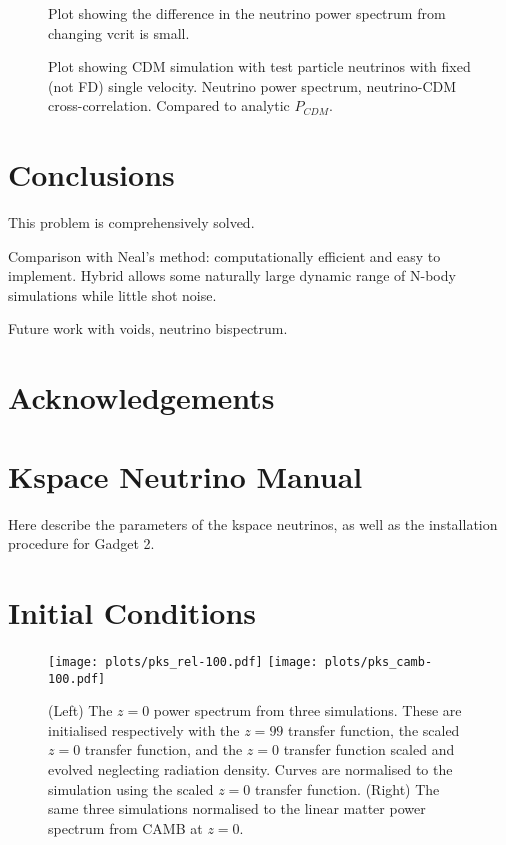 \documentclass[useAMS, usenatbib]{mnras}
\begin{document}
\begin{figure}
  \caption{Plot showing the difference in the neutrino power spectrum from changing vcrit is small. }
  \label{fig:vcrit}
\end{figure}

\begin{figure}
    \caption{Plot showing CDM simulation with test particle neutrinos with fixed (not FD) single velocity.
  Neutrino power spectrum, neutrino-CDM cross-correlation. Compared to analytic $P_{CDM}$.}
  \label{fig:testpart}
\end{figure}


\section{Conclusions}
\label{sec:conclusion}

This problem is comprehensively solved.

Comparison with Neal's method:
computationally efficient and easy to implement.
Hybrid allows some naturally large dynamic range of N-body simulations while little shot noise.

Future work with voids, neutrino bispectrum.

\section*{Acknowledgements}

\appendix

\section{Kspace Neutrino Manual}
\label{sec:manual}

Here describe the parameters of the kspace neutrinos,
as well as the installation procedure for Gadget 2.

\section{Initial Conditions}
\label{sec:initcond}

\begin{figure*}
\texttt{[image: plots/pks\_rel-100.pdf]}
\texttt{[image: plots/pks\_camb-100.pdf]}
  \caption{(Left) The $z=0$ power spectrum from three simulations. 
  These are initialised respectively with the $z=99$ transfer function, 
  the scaled $z=0$ transfer function, and the $z=0$ transfer function 
  scaled and evolved neglecting radiation density. 
  Curves are normalised to the simulation using the scaled $z=0$ transfer function.
  (Right) The same three simulations normalised to the linear matter 
  power spectrum from CAMB at $z=0$.}
  \label{fig:rescaling}
\end{figure*}
\end{document}
